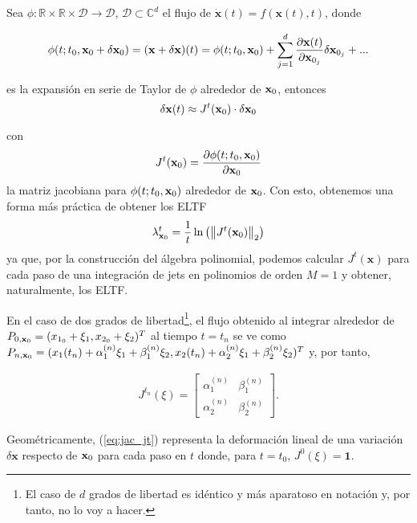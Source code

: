 Sea $\phi: \mathbb{R} \times \mathbb{R} \times \mathcal{D} \to \mathcal{D}$, $\mathcal{D} \subset \mathbb{C}^d$ el flujo de $\dot{\mathbf{x}}(t) = f(\mathbf{x}(t),t)$, donde

\begin{equation*}
 \phi(t;t_0,\mathbf{x}_0 + \delta \mathbf{x}_0) = (\mathbf{x + \delta x})(t) = \phi(t;t_0,\mathbf{x}_0) + \sum_{j=1}^d \frac{\partial \mathbf{x}(t)}{\partial \mathbf{x}_{0_j}}\delta \mathbf{x}_{0_j} + ...
\end{equation*}

es la expansión en serie de Taylor de $\phi$ alrededor de $\mathbf{x}_0$, entonces 
\begin{equation*}
 \delta \mathbf{x}(t) \approx J^t(\mathbf{x}_0) \cdot \delta \mathbf{x}_0
\end{equation*}

con 
\begin{equation}
 J^t(\mathbf{x}_0) = \frac{\partial \phi(t;t_0,\mathbf{x}_0)}{\partial \mathbf{x}_{0}}
 \label{eq:jacobian}
\end{equation}
la matriz jacobiana para $\phi(t;t_0,\mathbf{x}_0)$ alrededor de $\mathbf{x}_0$. Con esto, obtenemos una forma más práctica de obtener los ELTF
\begin{equation}
 \lambda_{\mathbf{x}_0}^t = \frac{1}{t}\ln \left( \left\lVert J^t(\mathbf{x}_0) \right\rVert_2 \right)
\end{equation}
ya que, por la construcción del álgebra polinomial, podemos calcular $J^t(\mathbf{x})$ para cada paso de una integración de jets en polinomios de orden $M=1$ y obtener, naturalmente, los ELTF.

En el caso de dos grados de libertad\footnote{El caso de $d$ grados de libertad es idéntico y más aparatoso en notación y, por tanto, no lo voy a hacer.}, el flujo obtenido al integrar alrededor de $P_{0,\mathbf{x}_0} = (x_{1_0} + \xi_1, x_{2_0} + \xi_2 )^T$ al tiempo $t=t_n$ se ve como $P_{n,\mathbf{x}_0} = (x_1(t_n) + \alpha_1^{(n)} \xi_1 + \beta_1^{(n)} \xi_2, x_2(t_n) + \alpha_2^{(n)} \xi_1 + \beta_2^{(n)} \xi_2)^T$ y, por tanto, 

\begin{align}
 J^{t_n}(\xi) = \left[ \begin{array}{ccc}
 \alpha_1^{(n)} & \beta_1^{(n)}  \\
 \alpha_2^{(n)} & \beta_2^{(n)}
 \end{array} \right].
 \label{eq:jac_jt}
\end{align}

Geométricamente, (\ref{eq:jac_jt}) representa la deformación lineal de una variación $\delta \mathbf{x}$ respecto de $\mathbf{x}_0$ para cada paso en $t$ donde, para $t = t_0$, $J^0(\xi) = \mathbf{1}$.


